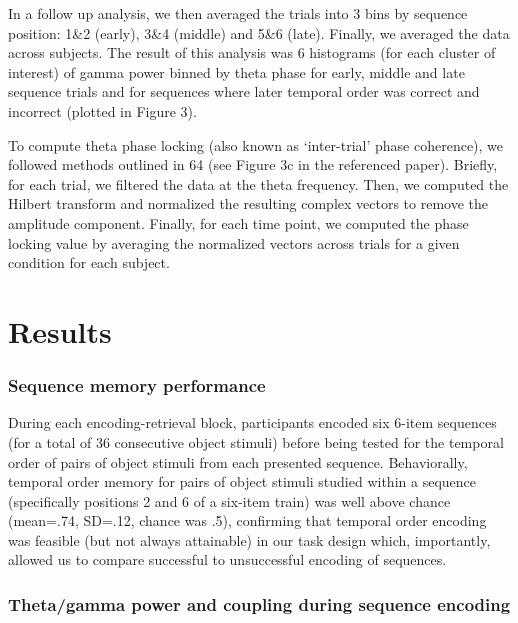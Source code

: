 In a follow up analysis, we then averaged the trials into 3 bins by
sequence position: 1\&2 (early), 3\&4 (middle) and 5\&6 (late). Finally,
we averaged the data across subjects. The result of this analysis was 6
histograms (for each cluster of interest) of gamma power binned by theta
phase for early, middle and late sequence trials and for sequences where
later temporal order was correct and incorrect (plotted in Figure 3).

To compute theta phase locking (also known as `inter-trial' phase
coherence), we followed methods outlined in 64 (see Figure 3c in the
referenced paper). Briefly, for each trial, we filtered the data at the
theta frequency. Then, we computed the Hilbert transform and normalized
the resulting complex vectors to remove the amplitude component.
Finally, for each time point, we computed the phase locking value by
averaging the normalized vectors across trials for a given condition for
each subject.

\section{Results}\label{results}

\subsubsection{Sequence memory
performance}\label{sequence-memory-performance}

During each encoding-retrieval block, participants encoded six 6-item
sequences (for a total of 36 consecutive object stimuli) before being
tested for the temporal order of pairs of object stimuli from each
presented sequence. Behaviorally, temporal order memory for pairs of
object stimuli studied within a sequence (specifically positions 2 and 6
of a six-item train) was well above chance (mean=.74, SD=.12, chance was
.5), confirming that temporal order encoding was feasible (but not
always attainable) in our task design which, importantly, allowed us to
compare successful to unsuccessful encoding of sequences.

\subsubsection{Theta/gamma power and coupling during sequence
encoding}\label{thetagamma-power-and-coupling-during-sequence-encoding}

